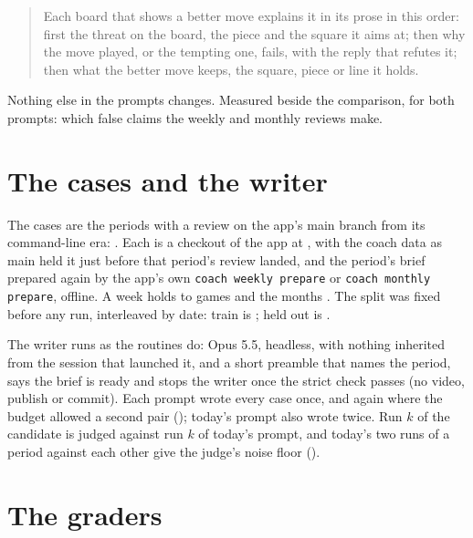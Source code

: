 \documentclass[11pt]{article}
\begin{document}
\begin{quote}\small
Each board that shows a better move explains it in its prose in this order: first the threat on the
board, the piece and the square it aims at; then why the move played, or the tempting one, fails,
with the reply that refutes it; then what the better move keeps, the square, piece or line it holds.
\end{quote}

Nothing else in the prompts changes. Measured beside the comparison, for both prompts: which false
claims the weekly and monthly reviews make.

\section{The cases and the writer}

The cases are the \Cases{} periods with a review on the app's main branch from its command-line
era: \CaseSpan. Each is a checkout of the app at
\texttt{\AppCommit}, with the coach data as main held it just before that period's review landed,
and the period's brief prepared again by the app's own \texttt{coach weekly prepare} or
\texttt{coach monthly prepare}, offline. A week holds \WeekGamesMin{} to \WeekGamesMax{} games and
the months \MonthGames. The split was fixed before any run, interleaved by date: train is
\TrainCases; held out is \HeldCases.

The writer runs as the routines do: Opus 5.5, headless, with nothing inherited from the session
that launched it, and a short preamble that names the period, says the brief is ready and stops the
writer once the strict check passes (no video, publish or commit). Each prompt wrote every case once,
and again where the budget allowed a second pair (\SecondPairCases); today's prompt also wrote
\BaseOnlySecond{} twice. Run $k$ of the candidate is judged against run $k$ of today's prompt, and today's two runs
of a period against each other give the judge's noise floor (\NullCases).

\section{The graders}
\end{document}
